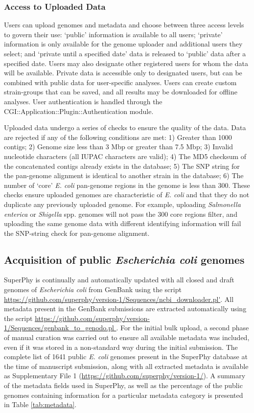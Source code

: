 \documentclass[doublespacing, linenumbers]{bmcart}
\begin{document}
\subsubsection{Access to Uploaded Data}
Users can upload genomes and metadata and choose between three access levels to govern their use: `public' information is available to all users; `private' information is only available for the genome uploader and additional users they select; and `private until a specified date' data is released to `public' data after a specified date. Users may also designate other registered users for whom the data will be available. Private data is accessible only to designated users, but can be combined with public data for user-specific analyses. Users can create custom strain-groups that can be saved, and all results may be downloaded for offline analyses. User authentication is handled through the CGI::Application::Plugin::Authentication module.

Uploaded data undergo a series of checks to ensure the quality of the data. Data are rejected if any of the following conditions are met: 1) Greater than 1000 contigs; 2) Genome size less than 3 Mbp or greater than 7.5 Mbp; 3) Invalid nucleotide characters (all IUPAC characters are valid); 4) The MD5 checksum of the concatenated contigs already exists in the database; 5) The SNP string for the pan-genome alignment is identical to another strain in the database; 6) The number of `core' \textit{E. coli} pan-genome regions in the genome is less than 300. These checks ensure uploaded genomes are characteristic of \textit{E. coli} and that they do not duplicate any previously uploaded genome. For example, uploading \textit{Salmonella enterica} or \textit{Shigella} spp. genomes will not pass the 300 core regions filter, and uploading the same genome data with different identifying information will fail the SNP-string check for pan-genome alignment.

\subsection{Acquisition of public \textit{Escherichia coli} genomes}
SuperPhy is continually and automatically updated with all closed and draft genomes of \textit{Escherichia coli} from GenBank using the script \url{https://github.com/superphy/version-1/Sequences/ncbi_downloader.pl'}. All metadata present in the GenBank submissions are extracted automatically using the script \url{https://github.com/superphy/version-1/Sequences/genbank_to_genodo.pl }. For the initial bulk upload, a second phase of manual curation was carried out to ensure all available metadata was included, even if it was stored in a non-standard way during the initial submission. The complete list of 1641 public \textit{E. coli} genomes present in the SuperPhy database at the time of manuscript submission, along with all extracted metadata is available as Supplementary File 1 (\url{https://github.com/superphy/version-1/}). A summary of the metadata fields used in SuperPhy, as well as the percentage of the public genomes containing information for a particular metadata category is presented in Table \ref{tab:metadata}. 
\end{document}
